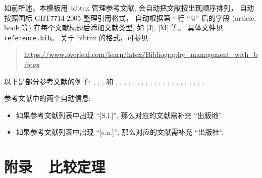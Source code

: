 \documentclass[twoside,doctor]{zjnuthesis}
\begin{document}
如前所述，本模板用 bibtex 管理参考文献, 会自动把文献按出现顺序排列，
自动按照国标 GBT7714-2005 整理引用格式，
自动根据第一行 \enquote{@} 后的字段 (article, book 等) 在每个文献标题后添加文献类型, 如 [J], [M] 等。
具体文件见 \texttt{reference.bib}。
关于 bibtex 的格式，可参见
\begin{quote}
  \url{https://www.overleaf.com/learn/latex/Bibliography_management_with_bibtex}
\end{quote}
以下是部分参考文献的例子: 
\cite{Smale1986}, \cite{WangHan1990}, \cite{Deuflhard2004}, \cite{test2004} 和
\cite{WangHan2000}, 
\cite{WangHan2001}, 
\cite{WangHan2002}, 
\cite{WangHan2003}, 
\cite{WangHan2004}, 
\cite{WangHan2005}, 
\cite{WangHan2006}, 
\cite{WangHan2007}, 
\cite{WangHan2008}, 
\cite{WangHan2009}, 
\cite{WangHan2010}, 
\cite{WangHan2011}, 
\cite{WangHan2012}, 
\cite{WangHan2013}, 
\cite{WangHan2014}, 
\cite{WangHan2015}, 
\cite{WangHan2016}, 
\cite{WangHan2017}, 
\cite{WangHan2018}, 
\cite{WangHan2019}, 
\cite{WangHan2020}, 
\cite{WangHan2021}

参考文献中的两个自动信息:
\begin{itemize}
\item 如果参考文献列表中出现 \enquote{[S.l.]}, 那么对应的文献需补充 \enquote{出版地}.
  
\item 如果参考文献列表中出现 \enquote{[s.n.]}, 那么对应的文献需补充 \enquote{出版社}.
\end{itemize}

\backmatter





\chapter{附录~~比较定理}
\end{document}
